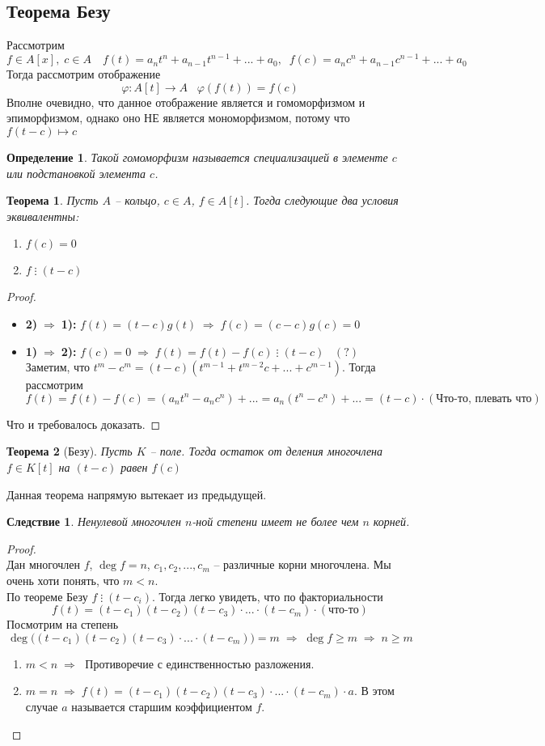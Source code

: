\documentclass[12pt, a4paper]{article}
\newcommand{\ra}{\;\Rightarrow\;}
\newcommand{\bo}{\geqslant}
\newcommand{\de}{\;\vdots\;}
\theoremstyle{plain}
\newtheorem*{Th*}{Теорема}
\newtheorem{Def}{Определение}
\newtheorem*{Corollary*}{Следствие}
\theoremstyle{definition}
\begin{document}
\subsection*{Теорема Безу}
Рассмотрим $f\in A[x],\; c\in A\quad f(t) = a_nt^n+a_{n-1}t^{n-1}+...+a_0,\;\;f(c) = a_nc^n+a_{n-1}c^{n-1}+...+a_0$
\\
Тогда рассмотрим отображение
\[\varphi: A[t]\to A\;\;\;\varphi(f(t)) = f(c)\]
Вполне очевидно, что данное отображение является и гомоморфизмом и эпиморфизмом, однако оно НЕ является мономорфизмом, потому что $f(t-c)\mapsto c$
\begin{Def}
    Такой гомоморфизм называется специализацией в элементе $c$ или подстановкой элемента $c$.
\end{Def}
\begin{Th*}
    Пусть $A$ -- кольцо, $c \in A$, $f\in A[t]$. Тогда следующие два условия эквивалентны:
    \begin{enumerate}
        \item $f(c)=0$
        \item $f\de (t-c)$
    \end{enumerate}
\end{Th*}
\begin{proof}~\
    \begin{itemize}
        \item \textbf{2)$\ra$1):} $f(t) = (t-c)g(t)\ra f(c) = (c-c)g(c) = 0$
        \item \textbf{1)$\ra$2):} $f(c) = 0 \ra f(t) = f(t)-f(c)\de (t-c)\;\;\; (?)$\\
        Заметим, что $t^m - c^m = (t-c)(t^{m-1}+t^{m-2}c+...+c^{m-1})$. Тогда рассмотрим
        \[f(t) = f(t)-f(c) = (a_nt^n - a_nc^n)+... = a_n(t^n - c^n)+... = (t-c)\cdot(\text{Что-то, плевать что})\]
    \end{itemize}
    Что и требовалось доказать.
\end{proof}
\begin{Th*}[Безу]
    Пусть $K$ -- поле. Тогда остаток от деления многочлена $f\in K[t]$ на $(t-c)$ равен $f(c)$
\end{Th*}
\noindent Данная теорема напрямую вытекает из предыдущей.
\begin{Corollary*}
    Ненулевой многочлен $n$-ной степени имеет не более чем $n$ корней.
\end{Corollary*}
\begin{proof}~\\
Дан многочлен $f$, $\deg f = n$, $c_1,c_2,...,c_m$ -- различные корни многочлена. Мы очень хоти понять, что $m<n$.\\
По теореме Безу $f\de (t-c_i)$. Тогда легко увидеть, что по факториальности 
\[f(t) =(t - c_1)(t-c_2)(t-c_3)\cdot...\cdot(t-c_m)\cdot(\text{что-то})\] 
Посмотрим на степень
\[\deg\big((t - c_1)(t-c_2)(t-c_3)\cdot...\cdot(t-c_m)\big) = m\ra \deg f \bo m \ra n\bo m\]
\begin{enumerate}
    \item $m<n\ra$ Противоречие с единственностью разложения.
    \item $m=n\ra f(t) =(t - c_1)(t-c_2)(t-c_3)\cdot...\cdot(t-c_m)\cdot a$. В этом случае $a$ называется старшим коэффициентом $f$.
\end{enumerate}
\end{proof}
\end{document}
